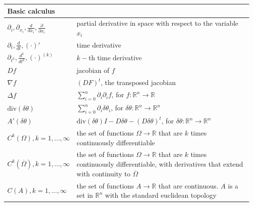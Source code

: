 \documentclass[english,a4paper,9pt,oneside]{scrbook}	%
\theoremstyle{break}
\theoremstyle{remark}
\newcommand{\mR}{\mathbb{R}}
\newcommand{\te}{\theta}
\newcommand{\dive}{\text{div}}
\begin{document}
\begin{longtable}{ll}
\multicolumn{2}{l}{\textbf{Basic calculus}}    \\ 
\hline
$\partial_i, \partial_{x_i}, \frac{d}{dx_i}, \frac{\partial}{\partial x_i}$ & partial derivative in space with respect to the variable $x_i$                      \\ 
\hline
$\partial_t, \frac{d}{dt}, (\cdot)'$ & time derivative                       \\ 
\hline
$\partial_{t^k}, \frac{d^k}{dt^{k}}, (\cdot)^{(k)}$ & $k-$th time derivative                       \\ 
\hline
$Df$ & jacobian of $f$                       \\
\hline
$\nabla f$ & $(DF)^t$, the transposed jacobian                       \\  
\hline
$\Delta f$ & $\sum_{i=0}^n \partial_i\partial_i f$, for $f:\mR^n \rightarrow\mR$ \\ 
\hline
$\dive(\delta \te)$ & $\sum_{i=0}^n \partial_i\delta \te_i$, for $\delta \te:\mR^n \rightarrow\mR^n$ \\ 
\hline
$A'(\delta \te)$ & $\dive(\delta \te)I -D\delta \te -(D\delta \te)^t$, for $\delta \te:\mR^n \rightarrow\mR^n$ \\ 
\hline
$C^k(\Omega), k=1,...,\infty$ & the set of functions $\Omega \rightarrow \mR$ that are $k$ times continuously differentiable                       \\ 
\hline
$C^k(\overline{\Omega}), k=1,...,\infty$ & \makecell[l]{the set of functions $\Omega \rightarrow \mR$ that are $k$ times continuously differentiable, with derivatives that extend\\ with continuity to $\overline{\Omega}$ } \\ 
\hline
$C(A), k=1,...,\infty$ & \makecell[l]{the set of functions $A \rightarrow \mR$ that are continuous. $A$ is a set in $\mR^n$ with the standard euclidean\\ topology} \\ 
\hline


\end{longtable}
\end{document}
